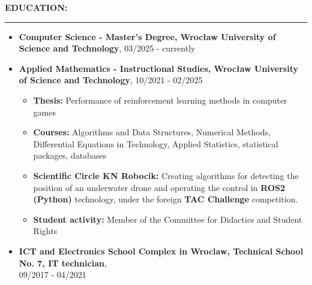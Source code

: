 \documentclass[10pt]{article}
\newcommand{\longline}{\rule{19.6cm}{1pt}}
\begin{document}
\newpage
\vspace*{10pt}
\noindent \fontsize{14pt}{14pt}\selectfont \textbf{\color{Violet}EDUCATION:}
\fontsize{10pt}{10pt}\selectfont 
\\ 
\noindent \longline 
\begin{itemize}[leftmargin=*]
    \item \textbf{Computer Science - Master's Degree, Wrocław University of Science and Technology}, 03/2025 - currently
    \item \textbf{Applied Mathematics - Instructional Studies, Wrocław University of Science and Technology}, 10/2021 - 02/2025
    \begin{itemize}
    \item \textbf{Thesis:} Performance of reinforcement learning methods in computer games
    \item \textbf{Courses:} Algorithms and Data Structures, Numerical Methods, Differential Equations in Technology, Applied Statistics, statistical packages, databases 
    \item \textbf{Scientific Circle KN Robocik:} Creating algorithms for detecting the position of an underwater drone and operating the control in \textbf{ROS2 (Python)} technology, under the foreign \textbf{TAC Challenge} competition.
    \item \textbf{Student activity:} Member of the Committee for Didactics and Student Rights
    \end{itemize}
    \item \textbf{ICT and Electronics School Complex in Wroclaw, Technical School No. 7, IT technician}, \\
    09/2017 - 04/2021 
\end{itemize}
\end{document}

